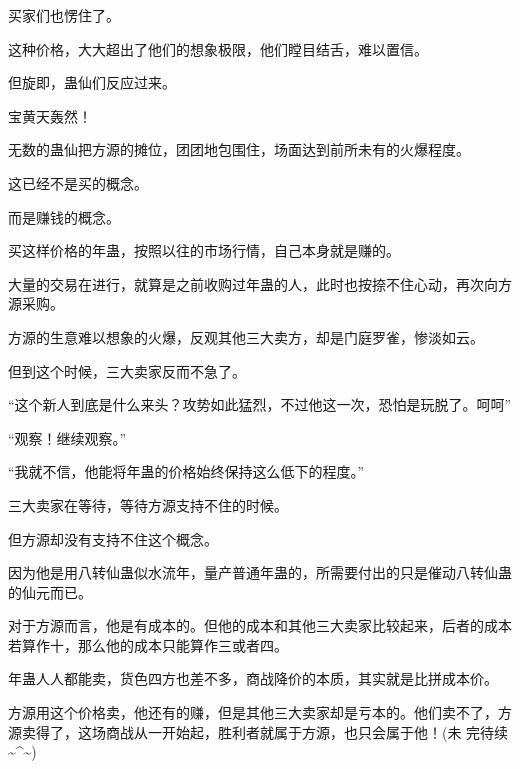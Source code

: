 \begin{this_body}
买家们也愣住了。

这种价格，大大超出了他们的想象极限，他们瞠目结舌，难以置信。

但旋即，蛊仙们反应过来。

宝黄天轰然！

无数的蛊仙把方源的摊位，团团地包围住，场面达到前所未有的火爆程度。

这已经不是买的概念。

而是赚钱的概念。

买这样价格的年蛊，按照以往的市场行情，自己本身就是赚的。

大量的交易在进行，就算是之前收购过年蛊的人，此时也按捺不住心动，再次向方源采购。

方源的生意难以想象的火爆，反观其他三大卖方，却是门庭罗雀，惨淡如云。

但到这个时候，三大卖家反而不急了。

“这个新人到底是什么来头？攻势如此猛烈，不过他这一次，恐怕是玩脱了。呵呵”

“观察！继续观察。”

“我就不信，他能将年蛊的价格始终保持这么低下的程度。”

三大卖家在等待，等待方源支持不住的时候。

但方源却没有支持不住这个概念。

因为他是用八转仙蛊似水流年，量产普通年蛊的，所需要付出的只是催动八转仙蛊的仙元而已。

对于方源而言，他是有成本的。但他的成本和其他三大卖家比较起来，后者的成本若算作十，那么他的成本只能算作三或者四。

年蛊人人都能卖，货色四方也差不多，商战降价的本质，其实就是比拼成本价。

方源用这个价格卖，他还有的赚，但是其他三大卖家却是亏本的。他们卖不了，方源卖得了，这场商战从一开始起，胜利者就属于方源，也只会属于他！(未 完待续 \~{}\^{}\~{})

\end{this_body}

